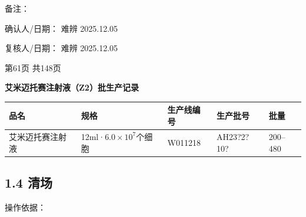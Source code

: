 \documentclass[UTF8,10pt,a4paper,fontset=fandol]{ctexart}
\newcommand{\fieldvalue}[1]{#1}
\newcommand{\handwritten}[1]{#1}
\begin{document}
\vspace{0.4em}

备注：\underline{\hspace{8cm}}

\vspace{0.5em}

确认人/日期：
\fieldvalue{\handwritten{难辨}}\quad
\fieldvalue{\handwritten{2025.12.05}}

\hspace{2em}
复核人/日期：
\fieldvalue{\handwritten{难辨}}\quad
\fieldvalue{\handwritten{2025.12.05}}

\begin{center}
第61页 共148页
\end{center}

\newpage

\begin{center}
\textbf{艾米迈托赛注射液（Z2）批生产记录}
\end{center}

\begin{tabular}{|p{2.2cm}|p{3.1cm}|p{2.2cm}|p{3.0cm}|p{1.8cm}|}
\hline
品名 & 规格 & 生产线编号 & 生产批号 & 批量 \\
\hline
\fieldvalue{艾米迈托赛注射液} &
\fieldvalue{12ml·$6.0\times10^{7}$个细胞} &
\fieldvalue{\handwritten{W011218}} &
\fieldvalue{\handwritten{AH23?2?10?}} &
\fieldvalue{200--480} \\
\hline
\end{tabular}

\subsection*{1.4 清场}

操作依据：
\end{document}
